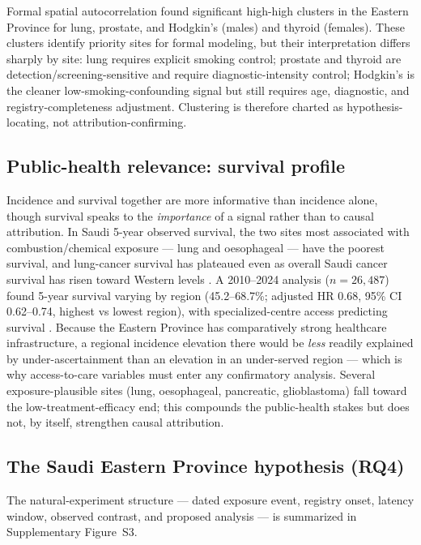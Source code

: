 \documentclass[3p,times]{elsarticle}
\begin{document}
Formal spatial autocorrelation \citep{alahmadi2013} found significant high-high clusters in the Eastern Province for lung, prostate, and Hodgkin's (males) and thyroid (females). These clusters identify priority sites for formal modeling, but their interpretation differs sharply by site: lung requires explicit smoking control; prostate and thyroid are detection/screening-sensitive and require diagnostic-intensity control; Hodgkin's is the cleaner low-smoking-confounding signal but still requires age, diagnostic, and registry-completeness adjustment. Clustering is therefore charted as hypothesis-locating, not attribution-confirming.

\subsection{Public-health relevance: survival profile}
Incidence and survival together are more informative than incidence alone, though survival speaks to the \emph{importance} of a signal rather than to causal attribution. In Saudi 5-year observed survival, the two sites most associated with combustion/chemical exposure --- lung and oesophageal --- have the poorest survival, and lung-cancer survival has plateaued even as overall Saudi cancer survival has risen toward Western levels \citep{ksasurv2022,concord3}. A 2010--2024 analysis ($n=26{,}487$) found 5-year survival varying by region (45.2--68.7\%; adjusted HR 0.68, 95\% CI 0.62--0.74, highest vs lowest region), with specialized-centre access predicting survival \citep{ksaregional2024}. Because the Eastern Province has comparatively strong healthcare infrastructure, a regional incidence elevation there would be \emph{less} readily explained by under-ascertainment than an elevation in an under-served region --- which is why access-to-care variables must enter any confirmatory analysis. Several exposure-plausible sites (lung, oesophageal, pancreatic, glioblastoma) fall toward the low-treatment-efficacy end; this compounds the public-health stakes but does not, by itself, strengthen causal attribution.

\subsection{The Saudi Eastern Province hypothesis (RQ4)}\label{sec:saudi}
The natural-experiment structure --- dated exposure event, registry onset, latency window, observed contrast, and proposed analysis --- is summarized in Supplementary Figure~S3.
\end{document}
